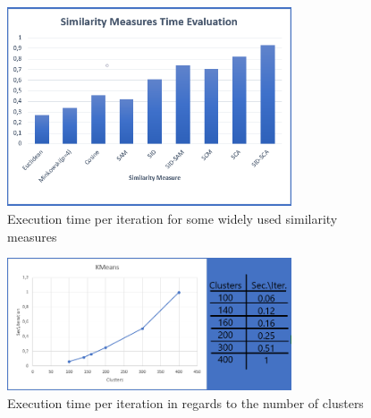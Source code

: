 \documentclass{article}
\begin{document}
{                    \begin{figure}[h]
                        \centering
                        \includegraphics[width=0.75\textwidth]{Figures/ExTime.PNG}
                        \caption{Execution time per iteration for some widely used similarity measures}
                        \label{fig:example}
                    \end{figure}
                
                    \begin{figure}[h]
                        \centering
                        \includegraphics[width=0.75\textwidth]{Figures/KmeansTime.PNG}
                        \caption{Execution time per iteration in regards to the number of clusters}
                        \label{fig:example}
                    \end{figure}
                    \vspace*{10\baselineskip}
                    \newpage
                
}
\end{document}
